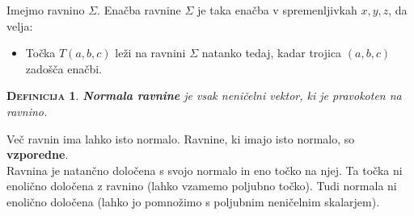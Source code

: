 \documentclass[a4paper,12pt]{article}
\newtheorem*{definicija}{\textsc{Definicija}}
\begin{document}
Imejmo ravnino $\Sigma$. Enačba ravnine $\Sigma$ je taka enačba v spremenljivkah $x,y,z$, da velja: \\

\begin{itemize}
\item Točka $T(a,b,c)$ leži na ravnini $\Sigma$ natanko tedaj, kadar trojica $(a,b,c)$ zadošča enačbi.\\
\end{itemize}

\begin{definicija}
\textbf{Normala ravnine} je vsak neničelni vektor, ki je pravokoten na ravnino.\\
\end{definicija}
 
Več ravnin ima lahko isto normalo. Ravnine, ki imajo isto normalo, so \textbf{vzporedne}. \\

Ravnina je natančno določena s svojo normalo in eno točko na njej. Ta točka ni enolično določena z ravnino (lahko vzamemo poljubno točko). Tudi normala ni enolično določena (lahko jo pomnožimo s poljubnim neničelnim skalarjem). \\
\end{document}
